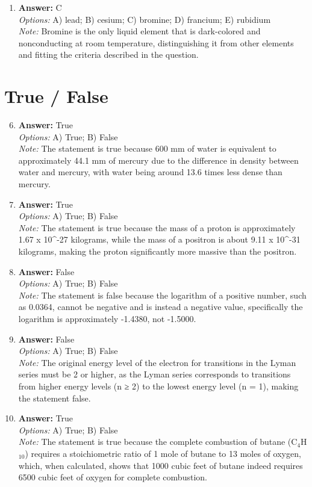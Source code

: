 \documentclass[12pt]{article}
\begin{document}
\begin{enumerate}[label=\arabic*.]
\item \textbf{Answer:} C
\\ \textit{Options:} A) lead; B) cesium; C) bromine; D) francium; E) rubidium
\\ \textit{Note:} Bromine is the only liquid element that is dark-colored and nonconducting at room temperature, distinguishing it from other elements and fitting the criteria described in the question.
\end{enumerate}

\section*{True / False}
\begin{enumerate}[label=\arabic*.]
\setcounter{enumi}{5}
\item \textbf{Answer:} True
\\ \textit{Options:} A) True; B) False
\\ \textit{Note:} The statement is true because 600 mm of water is equivalent to approximately 44.1 mm of mercury due to the difference in density between water and mercury, with water being around 13.6 times less dense than mercury.
\item \textbf{Answer:} True
\\ \textit{Options:} A) True; B) False
\\ \textit{Note:} The statement is true because the mass of a proton is approximately 1.67 x 10^-27 kilograms, while the mass of a positron is about 9.11 x 10^-31 kilograms, making the proton significantly more massive than the positron.
\item \textbf{Answer:} False
\\ \textit{Options:} A) True; B) False
\\ \textit{Note:} The statement is false because the logarithm of a positive number, such as 0.0364, cannot be negative and is instead a negative value, specifically the logarithm is approximately -1.4380, not -1.5000.
\item \textbf{Answer:} False
\\ \textit{Options:} A) True; B) False
\\ \textit{Note:} The original energy level of the electron for transitions in the Lyman series must be 2 or higher, as the Lyman series corresponds to transitions from higher energy levels (n ≥ 2) to the lowest energy level (n = 1), making the statement false.
\item \textbf{Answer:} True
\\ \textit{Options:} A) True; B) False
\\ \textit{Note:} The statement is true because the complete combustion of butane (C$_{4}$H$_{10}$) requires a stoichiometric ratio of 1 mole of butane to 13 moles of oxygen, which, when calculated, shows that 1000 cubic feet of butane indeed requires 6500 cubic feet of oxygen for complete combustion.
\end{enumerate}
\end{document}
